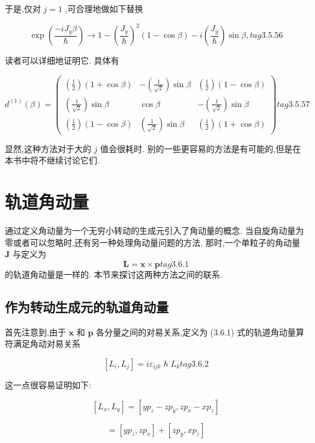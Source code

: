 于是,仅对 $j = 1$ ,可合理地做如下替换

$$
\exp \left( \frac{-i{J}_{y}\beta }{\hslash }\right) \rightarrow 1 - {\left( \frac{{J}_{y}}{\hslash }\right) }^{2}\left( {1 - \cos \beta }\right) - i\left( \frac{{J}_{y}}{\hslash }\right) \sin \beta , tag{3. 5.56}
$$

读者可以详细地证明它. 具体有

$$
{d}^{\left( 1\right) }\left( \beta \right) = \left( \begin{matrix} \left( \frac{1}{2}\right) \left( {1 + \cos \beta }\right) & - \left( \frac{1}{\sqrt{2}}\right) \sin \beta & \left( \frac{1}{2}\right) \left( {1 - \cos \beta }\right) \\ \left( \frac{1}{\sqrt{2}}\right) \sin \beta & \cos \beta & - \left( \frac{1}{\sqrt{2}}\right) \sin \beta \\ \left( \frac{1}{2}\right) \left( {1 - \cos \beta }\right) & \left( \frac{1}{\sqrt{2}}\right) \sin \beta & \left( \frac{1}{2}\right) \left( {1 + \cos \beta }\right) \end{matrix}\right) tag{3. 5.57}
$$

显然,这种方法对于大的 $j$ 值会很耗时. 别的一些更容易的方法是有可能的,但是在本书中将不继续讨论它们.

\section{轨道角动量}
通过定义角动量为一个无穷小转动的生成元引入了角动量的概念. 当自旋角动量为零或者可以忽略时,还有另一种处理角动量问题的方法. 那时,一个单粒子的角动量 $\mathbf{J}$ 与定义为
$$
\mathbf{L} = \mathbf{x} \times \mathbf{p} tag{3.6.1}
$$
的轨道角动量是一样的. 本节来探讨这两种方法之间的联系.
\subsection{作为转动生成元的轨道角动量}

首先注意到,由于 $\mathbf{x}$ 和 $\mathbf{p}$ 各分量之间的对易关系,定义为 (3.6.1) 式的轨道角动量算符满足角动对易关系

$$
\left\lbrack {{L}_{i},{L}_{j}}\right\rbrack = i{\varepsilon }_{ijk}\hslash {L}_{k} tag{3.6.2}
$$

这一点很容易证明如下:

$$
\left\lbrack {{L}_{x},{L}_{y}}\right\rbrack = \left\lbrack {y{p}_{z} - z{p}_{y}, z{p}_{x} - x{p}_{z}}\right\rbrack
$$

$$
= \left\lbrack {y{p}_{z}, z{p}_{x}}\right\rbrack + \left\lbrack {z{p}_{y}, x{p}_{z}}\right\rbrack
$$

